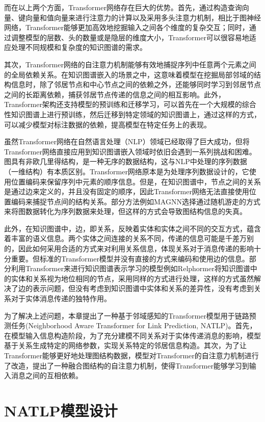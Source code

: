 而在以上两个方面，Transformer网络存在巨大的优势。首先，通过构造查询向量、键向量和值向量来进行注意力的计算以及采用多头注意力机制，相比于图神经网络，Transformer能够更加高效地挖掘输入之间各个维度的复杂交互；同时，通过调整模型的层数、头的数量或是隐层的维度大小，Transformer可以很容易地适应处理不同规模和复杂度的知识图谱的需求。

其次，Transformer网络的自注意力机制能够有效地捕捉序列中任意两个元素之间的全局依赖关系。在知识图谱嵌入的场景之中，这意味着模型在挖掘局部邻域的结构信息时，除了邻居节点和中心节点之间的依赖之外，还能够同时学习到邻居节点之间的长距离依赖，捕获邻居节点传递的信息之间的相互影响。此外，Transformer架构还支持模型的预训练和迁移学习，可以首先在一个大规模的综合性知识图谱上进行预训练，然后迁移到特定领域的知识图谱上，通过这样的方式，可以减少模型对标注数据的依赖，提高模型在特定任务上的表现。

虽然Transformer网络在自然语言处理（NLP）领域已经取得了巨大成功，但将Transformer网络直接应用到知识图谱嵌入领域时依旧会遇到一系列挑战和困难。图具有非欧几里得结构，是一种无序的数据结构，这与NLP中处理的序列数据（一维结构）有本质区别。Transformer网络原本是为处理序列数据设计的，它使用位置编码来保留序列中元素的顺序信息。但是，在知识图谱中，节点之间的关系是通过边来定义的，并且没有固定的顺序，因此Transformer网络无法直接使用位置编码来捕捉节点间的结构关系。部分方法例如MAGNN选择通过随机游走的方式来将图数据转化为序列数据来处理，但这样的方式会导致图结构信息的失真。

此外，在知识图谱中，边，即关系，反映着实体和实体之间不同的交互方式，蕴含着丰富的语义信息。两个实体之间连接的关系不同，传递的信息可能是千差万别的，因此如何采用合适的方式来对利用关系信息，体现关系对于消息传递的影响十分重要。但标准的Transformer模型并没有直接的方式来编码和使用边的信息。部分利用Transformer来进行知识图谱表示学习的模型例如Relphormer将知识图谱中的实体和关系视为地位相同的节点，采用同样的方式进行处理，这样的方式虽然解决了边的表示问题，但没有考虑到知识图谱中实体和关系的差异性，没有考虑到关系对于实体消息传递的独特作用。

为了解决上述问题，本章提出了一种基于邻域感知的Transformer模型用于链路预测任务(Neighborhood Aware Transformer for Link Prediction, NATLP)。首先，在模型输入信息构造阶段，为了充分建模不同关系对于实体传递消息的影响，模型基于关系生成特定的网络参数，实现关系特定的邻居信息构造。其次，为了让Transformer能够更好地处理图结构数据，模型对Transformer的自注意力机制进行了改造，提出了一种融合图结构的自注意力机制，使得Transformer能够学习到输入消息之间的互相依赖。

\section{NATLP模型设计}

